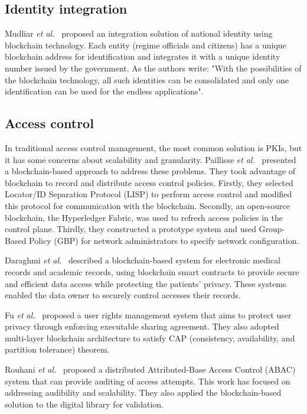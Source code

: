 \subsection{Identity integration}
Mudliar \emph{et al.}~\cite{mudliar2018comprehensive} proposed an integration solution of national identity using blockchain technology. Each entity (regime officials and citizens) has a unique blockchain address for identification and integrates it with a unique identity number issued by the government. As the authors write: "With the possibilities of the blockchain technology, all such identities can be consolidated and only one identification can be used for the endless applications".

\subsection{Access control}
In traditional access control management, the most common solution is PKIs, but it has some concerns about scalability and granularity. Paillisse \emph{et al.}~\cite{paillisse2019distributed} presented a blockchain-based approach to address these problems. They took advantage of blockchain to record and distribute access control policies. Firstly, they selected Locator/ID Separation Protocol (LISP) to perform access control and modified this protocol for communication with the blockchain. Secondly, an open-source blockchain, the Hyperledger Fabric, was used to refresh access policies in the control plane. Thirdly, they constructed a prototype system and used Group-Based Policy (GBP) for network administrators to specify network configuration.\par

Daraghmi \emph{et al.}~\cite{daraghmi2019medchain,daraghmi2019unichain} described a blockchain-based system for electronic medical records and academic records, using blockchain smart contracts to provide secure and efficient data access while protecting the patients' privacy. These systems enabled the data owner to securely control accesses their records.\par

Fu \emph{et al.}~\cite{fu2020soteria} proposed a user rights management system that aims to protect user privacy through enforcing executable sharing agreement. They also adopted multi-layer blockchain architecture to satisfy CAP (consistency, availability, and partition tolerance) theorem.\par

Rouhani \emph{et al.}~\cite{rouhani2020distributed} proposed a distributed Attributed-Base Access Control (ABAC) system that can provide auditing of access attempts. This work has focused on addressing audibility and scalability. They also applied the blockchain-based solution to the digital library for validation.\par

